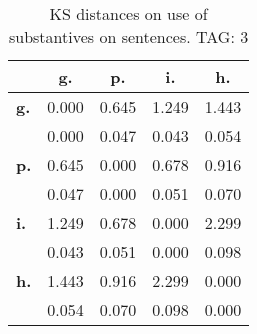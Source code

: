 \begin{table}[h!]
\begin{center}
\begin{tabular}{| l || c | c | c | c |}\hline
 & {\bf g.} & {\bf p.} & {\bf i.} & {\bf h.} \\\hline\hline
{\bf g.} & 0.000 & 0.645 & 1.249 & 1.443 \\
{\bf } & 0.000 & 0.047 & 0.043 & 0.054 \\\hline
{\bf p.} & 0.645 & 0.000 & 0.678 & 0.916 \\
{\bf } & 0.047 & 0.000 & 0.051 & 0.070 \\\hline
{\bf i.} & 1.249 & 0.678 & 0.000 & 2.299 \\
{\bf } & 0.043 & 0.051 & 0.000 & 0.098 \\\hline
{\bf h.} & 1.443 & 0.916 & 2.299 & 0.000 \\
{\bf } & 0.054 & 0.070 & 0.098 & 0.000 \\\hline
\end{tabular}
\caption{KS distances on use of substantives on sentences. TAG: 3}
\end{center}
\end{table}